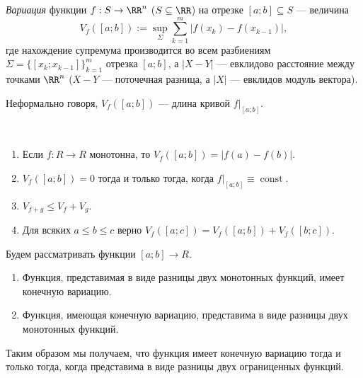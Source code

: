 \documentclass[12pt,a4paper]{article}
\DeclareMathOperator{\const}{const}
\begin{document}
    \begin{definition}
        \emph{Вариация} функции $f: S \to \RR^n$ ($S \subseteq \RR$) на отрезке $[a; b] \subseteq S$ --- величина
        \[V_f([a; b]) := \sup_\Sigma \sum_{k=1}^{m} |f(x_k) - f(x_{k-1})|,\]
        где нахождение супремума производится во всем разбиениям $\Sigma = \{[x_k; x_{k-1}]\}_{k=1}^m$ отрезка $[a; b]$, а $|X - Y|$ --- евклидово расстояние между точками $\RR^n$ ($X - Y$ --- поточечная разница, а $|X|$ --- евклидов модуль вектора).
    \end{definition}

    \begin{remark*}
        Неформально говоря, $V_f([a; b])$ --- длина кривой $f|_{[a; b]}$.
    \end{remark*}

    \begin{lemma}\ 
        \begin{enumerate}
            \item Если $f: R \to R$ монотонна, то $V_f([a; b]) = |f(a) - f(b)|$.
            \item $V_f([a; b]) = 0$ тогда и только тогда, когда $f|_{[a; b]} \equiv \const$.
            \item $V_{f+g} \leqslant V_f + V_g$.
            \item Для всяких $a \leqslant b \leqslant c$ верно $V_f([a; c]) = V_f([a; b]) + V_f([b; c])$.
        \end{enumerate}
    \end{lemma}

    \begin{lemma}
        Будем рассматривать функции $[a; b] \to R$.
        \begin{enumerate}
            \item Функция, представимая в виде разницы двух монотонных функций, имеет конечную вариацию.
            \item Функция, имеющая конечную вариацию, представима в виде разницы двух монотонных функций.
        \end{enumerate}
        Таким образом мы получаем, что функция имеет конечную вариацию тогда и только тогда, когда представима в виде разницы двух ограниценных функций.
    \end{lemma}
\end{document}
